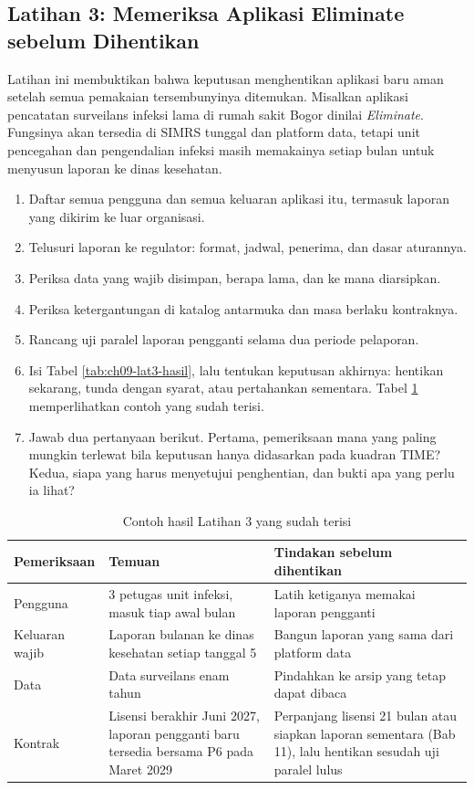 \subsection*{Latihan 3: Memeriksa Aplikasi Eliminate sebelum Dihentikan}

Latihan ini membuktikan bahwa keputusan menghentikan aplikasi baru aman
setelah semua pemakaian tersembunyinya ditemukan. Misalkan aplikasi
pencatatan surveilans infeksi lama di rumah sakit Bogor dinilai \textit{Eliminate}.
Fungsinya akan tersedia di SIMRS tunggal dan platform data, tetapi unit
pencegahan dan pengendalian infeksi masih memakainya setiap bulan untuk menyusun
laporan ke dinas kesehatan.

\begin{enumerate}
  \item Daftar semua pengguna dan semua keluaran aplikasi itu, termasuk
        laporan yang dikirim ke luar organisasi.
  \item Telusuri laporan ke regulator: format, jadwal, penerima, dan dasar
        aturannya.
  \item Periksa data yang wajib disimpan, berapa lama, dan ke mana diarsipkan.
  \item Periksa ketergantungan di katalog antarmuka dan masa berlaku
        kontraknya.
  \item Rancang uji paralel laporan pengganti selama dua periode pelaporan.
  \item Isi Tabel \ref{tab:ch09-lat3-hasil}, lalu tentukan keputusan
        akhirnya: hentikan sekarang, tunda dengan syarat, atau pertahankan
        sementara. Tabel \ref{tab:ch09-lat3-contoh} memperlihatkan contoh
        yang sudah terisi.
  \item Jawab dua pertanyaan berikut. Pertama, pemeriksaan mana yang paling
        mungkin terlewat bila keputusan hanya didasarkan pada kuadran TIME?
        Kedua, siapa yang harus menyetujui penghentian, dan bukti apa yang
        perlu ia lihat?
\end{enumerate}

\begin{table}[!htb]
  \centering
  \caption{Contoh hasil Latihan 3 yang sudah terisi}
  \label{tab:ch09-lat3-contoh}
  \small
  \begin{tabularx}{\textwidth}{lXX}
    \hline
    \textbf{Pemeriksaan} & \textbf{Temuan} & \textbf{Tindakan sebelum dihentikan} \\
    \hline
    Pengguna & 3 petugas unit infeksi, masuk tiap awal bulan & Latih ketiganya memakai laporan pengganti \\
    \hline
    Keluaran wajib & Laporan bulanan ke dinas kesehatan setiap tanggal 5 & Bangun laporan yang sama dari platform data \\
    \hline
    Data & Data surveilans enam tahun & Pindahkan ke arsip yang tetap dapat dibaca \\
    \hline
    Kontrak & Lisensi berakhir Juni 2027, laporan pengganti baru tersedia bersama P6 pada Maret 2029 & Perpanjang lisensi 21 bulan atau siapkan laporan sementara (Bab 11), lalu hentikan sesudah uji paralel lulus \\
    \hline
  \end{tabularx}
\end{table}

